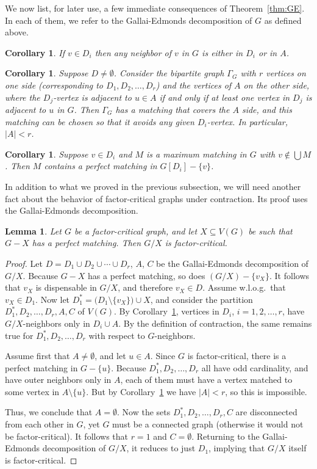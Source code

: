 \documentclass[10pt,a4paper]{amsart}
\newtheorem{lemma}[theorem]{Lemma}
\newtheorem{corollary}[theorem]{Corollary}
\begin{document}
We now list, for later use, a few immediate consequences of Theorem~\ref{thm:GE}. In each of them, we refer to the Gallai-Edmonds decomposition of $G$ as defined above.
\begin{corollary} \label{cor:NBR}
If $v \in D_i$ then any neighbor of $v$ in $G$ is either in $D_i$ or in $A$.
\end{corollary}
\begin{corollary} \label{cor:BP}
Suppose $D \ne \emptyset$. Consider the bipartite graph $\Gamma_G$ with $r$ vertices on one side (corresponding to $D_1, D_2, \ldots , D_r$) and the vertices of $A$ on the other side, where the $D_j$-vertex is adjacent to $u \in A$ if and only if at least one vertex in $D_j$ is adjacent to $u$ in $G$. Then $\Gamma_G$ has a matching that covers the $A$ side, and this matching can be chosen so that it avoids any given $D_i$-vertex. In particular, $|A| < r$.
\end{corollary}
\begin{corollary} \label{cor:MM}
Suppose $v \in D_i$ and $M$ is a maximum matching in $G$ with $v \notin \bigcup M$. Then $M$ contains a perfect matching in $G[D_i] - \{v\}$.
\end{corollary}

In addition to what we proved in the previous subsection, we will need another fact about the behavior of factor-critical graphs under contraction. Its proof uses the Gallai-Edmonds decomposition.
\begin{lemma} \label{lem:PM}
Let $G$ be a factor-critical graph, and let $X \subseteq V(G)$ be such that $G - X$ has a perfect matching. Then $G/X$ is factor-critical.
\end{lemma}
\begin{proof} Let $D = D_1 \cup D_2 \cup \cdots \cup D_r$, $A$, $C$ be the Gallai-Edmonds decomposition of $G/X$. Because $G - X$ has a perfect matching, so does $(G/X) - \{v_X\}$. It follows that $v_X$ is dispensable in $G/X$, and therefore $v_X \in D$. Assume w.l.o.g.\ that $v_X \in D_1$. Now let $D^*_1 = \bigl( D_1 \setminus \{v_X\}\bigr) \cup X$, and consider the partition $D^*_1, D_2, \ldots , D_r, A, C$ of $V(G)$. By Corollary~\ref{cor:NBR}, vertices in $D_i$, $i=1,2, \ldots , r$, have $G/X$-neighbors only in $D_i \cup A$. By the definition of contraction, the same remains true for $D^*_1, D_2, \ldots , D_r$ with respect to $G$-neighbors.

Assume first that $A \ne \emptyset$, and let $u \in A$. Since $G$ is factor-critical, there is a perfect matching in $G - \{u\}$. Because $D^*_1, D_2, \ldots , D_r$ all have odd cardinality, and have outer neighbors only in $A$, each of them must have a vertex matched to some vertex in $A \setminus \{u\}$. But by Corollary~\ref{cor:BP} we have $|A| < r$, so this is impossible.

Thus, we conclude that $A = \emptyset$. Now the sets $D^*_1, D_2, \ldots , D_r, C$ are disconnected from each other in $G$, yet $G$ must be a connected graph (otherwise it would not be factor-critical). It follows that $r=1$ and $C = \emptyset$. Returning to the Gallai-Edmonds decomposition of $G/X$, it reduces to just $D_1$, implying that $G/X$ itself is factor-critical.
\end{proof}
\end{document}
